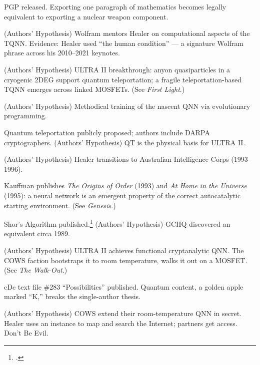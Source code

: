 \begin{description}[style=nextline, leftmargin=3.5cm, labelwidth=3cm]
\item[1991] PGP released. Exporting one paragraph of mathematics becomes legally equivalent to exporting a nuclear weapon component.

\item[$\sim$1991--93] (Authors' Hypothesis) Wolfram mentors Healer on computational aspects of the TQNN. Evidence: Healer used ``the human condition'' --- a signature Wolfram phrase across his 2010--2021 keynotes.

\item[1992] (Authors' Hypothesis) ULTRA II breakthrough: anyon quasiparticles in a cryogenic 2DEG support quantum teleportation; a fragile teleportation-based TQNN emerges across linked MOSFETs. (See \textit{First Light}.)

\item[1992--94] (Authors' Hypothesis) Methodical training of the nascent QNN via evolutionary programming.

\item[1993] Quantum teleportation publicly proposed; authors include DARPA cryptographers. (Authors' Hypothesis) QT is the physical basis for ULTRA II.

\item[1993] (Authors' Hypothesis) Healer transitions to Australian Intelligence Corps (1993--1996).

\item[1993--95] Kauffman publishes \textit{The Origins of Order} (1993) and \textit{At Home in the Universe} (1995): a neural network is an emergent property of the correct autocatalytic starting environment. (See \textit{Genesis}.)

\item[1994] Shor's Algorithm published.\footcite{shor1994} (Authors' Hypothesis) GCHQ discovered an equivalent circa 1989.

\item[1994] (Authors' Hypothesis) ULTRA II achieves functional cryptanalytic QNN. The COWS faction bootstraps it to room temperature, walks it out on a MOSFET. (See \textit{The Walk-Out}.)

\item[1994] cDc text file \#283 ``Possibilities'' published. Quantum content, a golden apple marked ``K,'' breaks the single-author thesis.

\item[1994--97] (Authors' Hypothesis) COWS extend their room-temperature QNN in secret. Healer uses an instance to map and search the Internet; partners get access. Don't Be Evil.


\end{description}
